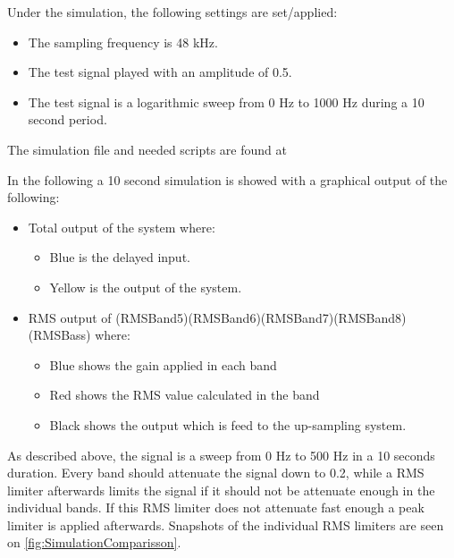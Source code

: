 Under the simulation, the following settings are set/applied:
\begin{itemize}
\item The sampling frequency is 48 kHz.
\item The test signal played with an amplitude of 0.5.
\item The test signal is a logarithmic sweep from 0 Hz to 1000 Hz during a 10 second period.
\end{itemize}

The simulation file and needed scripts are found at  


In the following a 10 second simulation is showed with a graphical output of the following:
\begin{itemize}
\item Total output of the system where:
\begin{itemize}
\item Blue is the delayed input.
\item Yellow is the output of the system.
\end{itemize}
\item RMS output of (RMSBand5)(RMSBand6)(RMSBand7)(RMSBand8)(RMSBass) where:
\begin{itemize}
\item Blue shows the gain applied in each band
\item Red shows the RMS value calculated in the band
\item Black shows the output which is feed to the up-sampling system.
\end{itemize} 
\end{itemize}

As described above, the signal is a sweep from 0 Hz to 500 Hz in a 10 seconds duration. Every band should attenuate the signal down to 0.2, while a RMS limiter afterwards limits the signal if it should not be attenuate enough in the individual bands. If this RMS limiter does not attenuate fast enough a peak limiter is applied afterwards. Snapshots of the individual RMS limiters are seen on \autoref{fig:SimulationComparisson}.    


